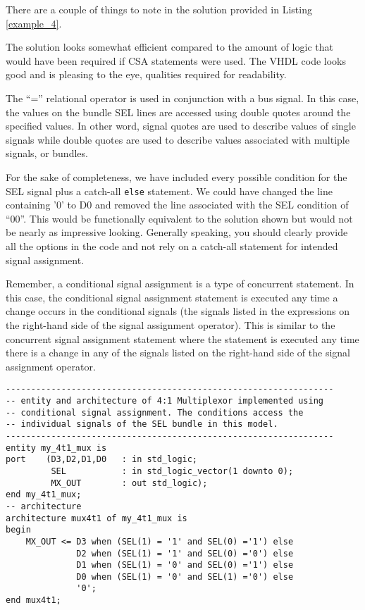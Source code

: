 There are a couple of things to note in the solution provided in Listing \ref{example_4}.
\begin{my_list}
\item The solution looks somewhat efficient compared to the amount of logic that would have been required if CSA statements were used. The VHDL code looks good and is pleasing to the eye, qualities required for readability.
\item The ``='' relational operator is used in conjunction with a bus signal. In this case, the values on the bundle SEL lines are accessed using double quotes around the specified values. In other word, signal quotes are used to describe values of single signals while double quotes are used to describe values associated with multiple signals, or bundles.
\item For the sake of completeness, we have included every possible condition for the SEL signal plus a catch-all \texttt{else} statement. We could have changed the line containing '0' to D0 and removed the line associated with the SEL condition of ``00''. This would be functionally equivalent to the solution shown but would not be nearly as impressive looking. Generally speaking, you should clearly provide all the options in the code and not rely on a catch-all statement for intended signal assignment.
\end{my_list}
Remember, a conditional signal assignment is a type of concurrent statement. In this case, the conditional signal assignment statement is executed any time a change occurs in the conditional signals (the signals listed in the expressions on the right-hand side of the signal assignment operator). This is similar to the concurrent signal assignment statement where the statement is executed any time there is a change in any of the signals listed on the right-hand side of the signal assignment operator.

\begin{lstlisting}[label=example_4_bis, caption=Alternative solution to Example 4 accessing individual signals.]
-----------------------------------------------------------------
-- entity and architecture of 4:1 Multiplexor implemented using
-- conditional signal assignment. The conditions access the
-- individual signals of the SEL bundle in this model.
-----------------------------------------------------------------
entity my_4t1_mux is
port	(D3,D2,D1,D0   : in std_logic;
         SEL           : in std_logic_vector(1 downto 0);
         MX_OUT        : out std_logic);
end my_4t1_mux;
-- architecture
architecture mux4t1 of my_4t1_mux is
begin
	MX_OUT <= D3 when (SEL(1) = '1' and SEL(0) ='1') else
	          D2 when (SEL(1) = '1' and SEL(0) ='0') else
	          D1 when (SEL(1) = '0' and SEL(0) ='1') else
	          D0 when (SEL(1) = '0' and SEL(1) ='0') else
	          '0';
end mux4t1;
\end{lstlisting}

